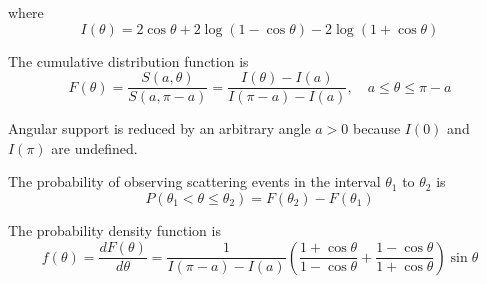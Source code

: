 where
\begin{equation*}
I(\theta)=2\cos\theta+2\log(1-\cos\theta)-2\log(1+\cos\theta)
\end{equation*}

The cumulative distribution function is
\begin{equation*}
F(\theta)
=\frac{S(a,\theta)}{S(a,\pi-a)}
=\frac{I(\theta)-I(a)}{I(\pi-a)-I(a)},
\quad
a\le\theta\le\pi-a
\end{equation*}

Angular support is reduced by an arbitrary angle $a>0$ because $I(0)$ and $I(\pi)$ are undefined.

\bigskip
The probability of observing scattering events in the interval $\theta_1$ to $\theta_2$ is
\begin{equation*}
P(\theta_1<\theta\le\theta_2)=F(\theta_2)-F(\theta_1)
\end{equation*}

The probability density function is
\begin{equation*}
f(\theta)=\frac{dF(\theta)}{d\theta}
=\frac{1}{I(\pi-a)-I(a)}
\left(\frac{1+\cos\theta}{1-\cos\theta}+\frac{1-\cos\theta}{1+\cos\theta}\right)
\sin\theta
\end{equation*}


